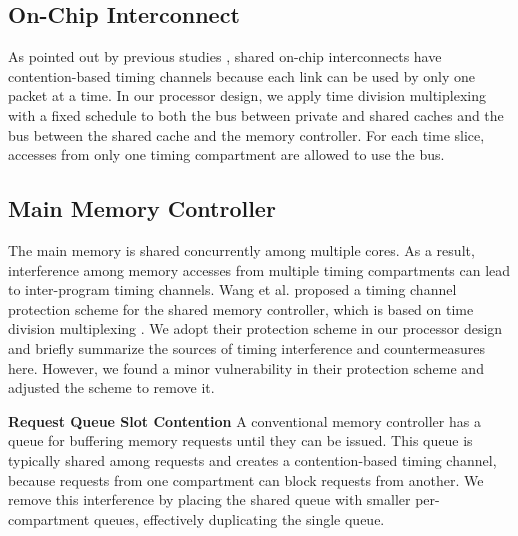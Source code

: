 \subsection{On-Chip Interconnect}

As pointed out by previous studies \cite{yaonocs, surfnoc}, shared on-chip 
interconnects have contention-based timing channels because each link can
be used by only one packet at a time. In our processor design, we apply time
division multiplexing with a fixed schedule to both the bus between private
and shared caches and the bus between the shared cache and the memory 
controller.
For each time slice, accesses from only one timing compartment are allowed to
use the bus.

\subsection{Main Memory Controller}

The main memory is shared concurrently among multiple cores. As a result,
interference among memory accesses from multiple timing compartments can lead
to inter-program timing channels. 
Wang et al. proposed a timing channel protection scheme for the shared memory
controller, which is based on time division multiplexing \cite{ushpca14}. We 
adopt their protection scheme in our processor design and briefly summarize the 
sources of timing interference and countermeasures here.
However, we found a minor vulnerability in their protection scheme and
adjusted the scheme to remove it.

\textbf{Request Queue Slot Contention}
A conventional memory controller has a queue for buffering memory requests 
until they can be issued. This queue is typically shared among requests and creates
a contention-based timing channel, because requests from one compartment can 
block requests from another. We remove this interference by placing the shared queue 
with smaller per-compartment queues, effectively duplicating the single queue.

